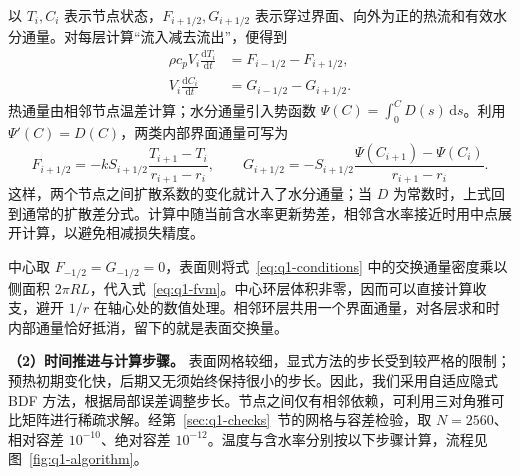\documentclass[UTF8,a4paper]{ctexart}
\begin{document}
以 \(T_i,C_i\) 表示节点状态，\(F_{i+1/2},G_{i+1/2}\) 表示穿过界面、向外为正的热流和有效水分通量。对每层计算“流入减去流出”，便得到
\begin{equation}
\begin{aligned}
\rho c_pV_i\frac{\mathrm{d}T_i}{\mathrm{d}t}
 &=F_{i-1/2}-F_{i+1/2},\\
V_i\frac{\mathrm{d}C_i}{\mathrm{d}t}
 &=G_{i-1/2}-G_{i+1/2}.
\end{aligned}
\label{eq:q1-fvm}
\end{equation}
热通量由相邻节点温差计算；水分通量引入势函数 \(\Psi(C)=\int_0^C D(s)\,\mathrm{d}s\)。利用 \(\Psi'(C)=D(C)\)，两类内部界面通量可写为
\begin{equation}
F_{i+1/2}=-kS_{i+1/2}\frac{T_{i+1}-T_i}{r_{i+1}-r_i},
\qquad
G_{i+1/2}=-S_{i+1/2}\frac{\Psi(C_{i+1})-\Psi(C_i)}{r_{i+1}-r_i}.
\label{eq:q1-interface-flux}
\end{equation}
这样，两个节点之间扩散系数的变化就计入了水分通量；当 \(D\) 为常数时，上式回到通常的扩散差分式。计算中随当前含水率更新势差，相邻含水率接近时用中点展开计算，以避免相减损失精度。

中心取 \(F_{-1/2}=G_{-1/2}=0\)，表面则将式~\eqref{eq:q1-conditions} 中的交换通量密度乘以侧面积 \(2\pi RL\)，代入式~\eqref{eq:q1-fvm}。中心环层体积非零，因而可以直接计算收支，避开 \(1/r\) 在轴心处的数值处理。相邻环层共用一个界面通量，对各层求和时内部通量恰好抵消，留下的就是表面交换量。

\noindent\textbf{（2）时间推进与计算步骤。}
表面网格较细，显式方法的步长受到较严格的限制；预热初期变化快，后期又无须始终保持很小的步长。因此，我们采用自适应隐式 BDF 方法\cite{shampine1997}，根据局部误差调整步长。节点之间仅有相邻依赖，可利用三对角雅可比矩阵进行稀疏求解。经第~\ref{sec:q1-checks}~节的网格与容差检验，取 \(N=2560\)、相对容差 \(10^{-10}\)、绝对容差 \(10^{-12}\)。温度与含水率分别按以下步骤计算，流程见图~\ref{fig:q1-algorithm}。
\end{document}
